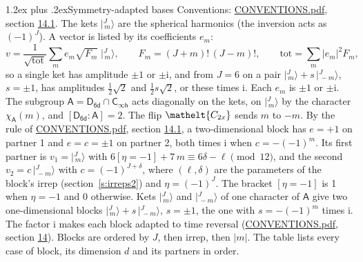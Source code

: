 \documentclass[10pt,a4paper]{article}
\makeatletter
\renewcommand\section{\@startsection{section}{1}{\z@}{-3ex plus -1ex minus -.2ex}%
  {1.2ex plus .2ex}{\normalfont\large\sffamily\bfseries\color{parttitle}}}
\numberwithin{equation}{section}
\newcommand{\eltfont}[1]{{\let\sigma\eltsigma\mathelt{#1}}}
\newcommand{\grp}[1]{\mathsf{#1}}
\newcommand{\elt}[1]{\eltfont{#1}}
\newcommand{\grpindex}[2]{[#1 : #2]}
\newcommand{\iverson}[1]{[#1]}
\newcommand{\iunit}{\mathrm{i}}
\newcommand{\chiA}{\chi_{\grp{A}}}
\newcommand{\jm}[2]{\bigl\lvert{}^{#1}_{\,#2}\bigr\rangle}
\makeatother
\begin{document}
\section{Symmetry-adapted bases}\label{s:bases}
Conventions: \href{../../CONVENTIONS.pdf}{CONVENTIONS.pdf}, section \href{../../CONVENTIONS.pdf\#conv.14.1}{14.1}.
\leavevmode\label{n:index.m}\label{n:vector.ket}The kets $\jm{J}{m}$ are the spherical harmonics (the inversion acts as $(-1)^J$). \label{n:index.ketcoefficient}\label{n:vector.basis.symmetry}\label{n:index.ketweight}\label{n:index.total}A vector is listed by its coefficients $e_m$:
\begin{equation}\label{e:ket}v = \frac{1}{\sqrt{\mathrm{tot}}}\sum_m e_m\sqrt{F_m}\;\jm{J}{m},\qquad F_m = (J+m)!\,(J-m)!,\qquad \mathrm{tot} = \sum_m |e_m|^2F_m,\end{equation}
\leavevmode\label{n:index.pair.sign}so a single ket has amplitude $\pm1$ or $\pm\iunit$, and from $J = 6$ on a pair $\jm{J}{m} + s\,\jm{J}{-m}$, $s = \pm1$, has amplitudes $\tfrac{1}{2}\sqrt{2}$ and $\tfrac{1}{2}s\sqrt{2}$, or these times $\iunit$. Each $e_m$ is $\pm1$ or $\pm\iunit$.
\leavevmode\label{n:group.A}\label{n:function.character.abelian}The subgroup $\grp{A} = \grp{D_{6d}}\cap\grp{C_{\infty h}}$ acts diagonally on the kets, on $\jm{J}{m}$ by the character $\chiA(m)$, and $\grpindex{\grp{D_{6d}}}{\grp{A}} = 2$. The flip $\elt{C_{2x}}$ sends $m$ to $-m$. \label{n:index.partner.sign}By the rule of \href{../../CONVENTIONS.pdf}{CONVENTIONS.pdf}, section \href{../../CONVENTIONS.pdf\#conv.14.1}{14.1}, a two-dimensional block has $e = +1$ on partner 1 and $e = c = \pm1$ on partner 2, both times $\iunit$ when $c = -(-1)^m$. \label{n:index.eta}Its first partner is $v_1 = \jm{J}{m}$ with $6\iverson{\eta = -1} + 7\,m \equiv 6\delta - \ell \pmod{12}$, and the second $v_2 = c\,\jm{J}{-m}$ with $c = (-1)^{J+\delta}$, where $(\ell, \delta)$ are the parameters of the block's irrep (section~\ref{s:irreps2}) and $\eta = (-1)^J$. The bracket $\iverson{\eta = -1}$ is 1 when $\eta = -1$ and 0 otherwise. Kets $\jm{J}{m}$ and $\jm{J}{-m}$ of one character of $\grp{A}$ give two one-dimensional blocks $\jm{J}{m} + s\,\jm{J}{-m}$, $s = \pm1$, the one with $s = -(-1)^m$ times $\iunit$. The factor $\iunit$ makes each block adapted to time reversal (\href{../../CONVENTIONS.pdf}{CONVENTIONS.pdf}, section \href{../../CONVENTIONS.pdf\#conv.14}{14}). Blocks are ordered by $J$, then irrep, then $|m|$.
\leavevmode\label{n:head.case}\label{n:head.partners}The table lists every case of block, its dimension $d$ and its partners in order.
\end{document}
